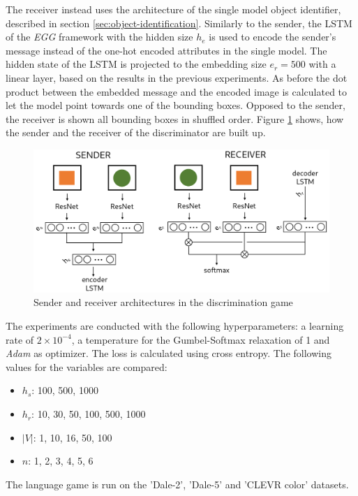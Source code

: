 The receiver instead uses the architecture of the single model object identifier, described in section \ref{sec:object-identification}.
Similarly to the sender, the LSTM of the \emph{EGG} framework with the hidden size $h_e$ is used to encode the sender's message instead of the one-hot encoded attributes in the single model.
The hidden state of the LSTM is projected to the embedding size $e_r=500$ with a linear layer, based on the results in the previous experiments.
As before the dot product between the embedded message and the encoded image is calculated to let the model point towards one of the bounding boxes.
Opposed to the sender, the receiver is shown all bounding boxes in shuffled order.
Figure \ref{fig:discriminator_architecture} shows, how the sender and the receiver of the discriminator are built up.

\begin{figure}[ht]
    \centering
    \includegraphics[width=.8\linewidth]{figures/arch_discriminator.png}
    \caption{Sender and receiver architectures in the discrimination game}
    \label{fig:discriminator_architecture}
\end{figure}

The experiments are conducted with the following hyperparameters: a learning rate of $2\times10^{-4}$, a temperature for the Gumbel-Softmax relaxation of 1 and \emph{Adam} \citep{Kingma2015} as optimizer.
The loss is calculated using cross entropy.
The following values for the variables are compared:
\begin{itemize}
    \item $h_s$: 100, 500, 1000
    \item $h_r$: 10, 30, 50, 100, 500, 1000
    \item $|V|$: 1, 10, 16, 50, 100
    \item $n$: 1, 2, 3, 4, 5, 6
\end{itemize}
The language game is run on the 'Dale-2', 'Dale-5' and 'CLEVR color' datasets.

